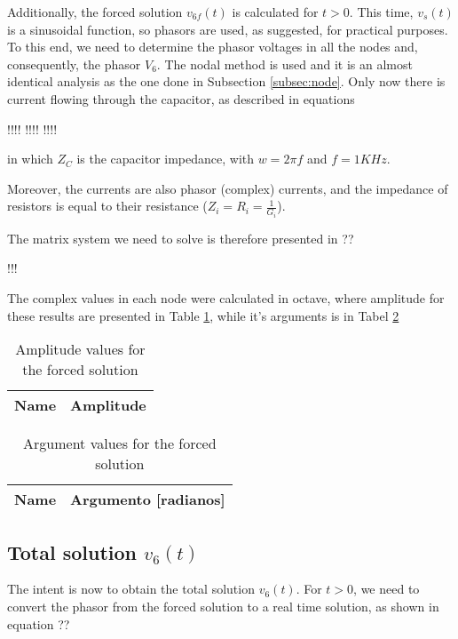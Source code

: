 Additionally, the forced solution $v_{6f}(t)$ is calculated for $t>0$. This time, $v_s(t)$ is a sinusoidal function, so phasors are used, as suggested, for practical purposes. To this end, we need to determine the phasor voltages in all the nodes and, consequently, the phasor $V_6$. The nodal method is used and it is an almost identical analysis as the one done in Subsection \ref{subsec:node}. Only now there is current flowing through the capacitor, as described in equations

!!!!
!!!!
!!!!

in which $Z_C$ is the capacitor impedance, with $w = 2\pi f$ and $f=1 KHz$.


Moreover, the currents are also phasor (complex) currents, and the impedance of resistors is equal to their resistance ($Z_i = R_i = \frac{1}{G_i}$).

The matrix system we need to solve is therefore presented in ??

!!!

The complex values in each node were calculated in octave, where amplitude for these results are presented in Table \ref{tab4_Amp}, while it's arguments is in Tabel \ref{tab4_Arg}


\begin{table}[!ht]
  \centering
  \begin{tabular}{|l|r|}
    \hline    
    {\bf Name} & {\bf Amplitude} \\ \hline
    
  \end{tabular}
  \caption{Amplitude values for the forced solution}
  \label{tab4_Amp}
\end{table}


\begin{table}[!ht]
  \centering
  \begin{tabular}{|l|r|}
    \hline    
    {\bf Name} & {\bf Argumento [radianos]} \\ \hline
    
  \end{tabular}
  \caption{Argument values for the forced solution }
  \label{tab4_Arg}
\end{table}

\newpage

\subsection{Total solution $v_{6}(t)$}
\label{subsec:total_theory}

The intent is now to obtain the total solution $v_6(t)$. For $t>0$, we need to convert the phasor from the forced solution to a real time solution, as shown in equation ??

